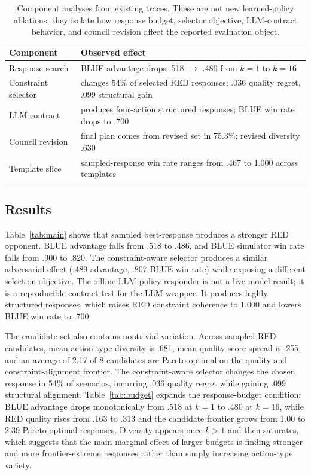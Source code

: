\documentclass[letterpaper]{article} %
\begin{document}
\begin{table}[t]
\centering
\scriptsize
\caption{Component analyses from existing traces. These are not new learned-policy ablations; they isolate how response budget, selector objective, LLM-contract behavior, and council revision affect the reported evaluation object.}
\label{tab:components}
\begin{tabular}{@{}lp{.55\linewidth}@{}}
\toprule
Component & Observed effect \\
\midrule
Response search & BLUE advantage drops .518 $\rightarrow$ .480 from $k=1$ to $k=16$ \\
Constraint selector & changes 54\% of selected RED responses; .036 quality regret, .099 structural gain \\
LLM contract & produces four-action structured responses; BLUE win rate drops to .700 \\
Council revision & final plan comes from revised set in 75.3\%; revised diversity .630 \\
Template slice & sampled-response win rate ranges from .467 to 1.000 across templates \\
\bottomrule
\end{tabular}
\end{table}

\subsection{Results}

Table~\ref{tab:main} shows that sampled best-response produces a stronger RED opponent. BLUE advantage falls from .518 to .486, and BLUE simulator win rate falls from .900 to .820. The constraint-aware selector produces a similar adversarial effect (.489 advantage, .807 BLUE win rate) while exposing a different selection objective. The offline LLM-policy responder is not a live model result; it is a reproducible contract test for the LLM wrapper. It produces highly structured responses, which raises RED constraint coherence to 1.000 and lowers BLUE win rate to .700.

The candidate set also contains nontrivial variation. Across sampled RED candidates, mean action-type diversity is .681, mean quality-score spread is .255, and an average of 2.17 of 8 candidates are Pareto-optimal on the quality and constraint-alignment frontier. The constraint-aware selector changes the chosen response in 54\% of scenarios, incurring .036 quality regret while gaining .099 structural alignment. Table~\ref{tab:budget} expands the response-budget condition: BLUE advantage drops monotonically from .518 at $k=1$ to .480 at $k=16$, while RED quality rises from .163 to .313 and the candidate frontier grows from 1.00 to 2.39 Pareto-optimal responses. Diversity appears once $k>1$ and then saturates, which suggests that the main marginal effect of larger budgets is finding stronger and more frontier-extreme responses rather than simply increasing action-type variety.
\end{document}
